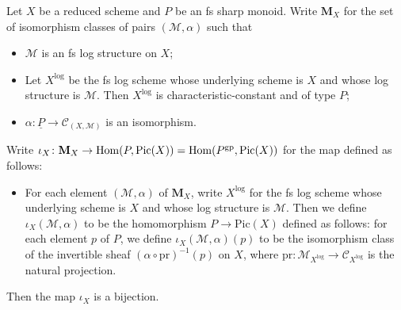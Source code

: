 \begin{lem}\label{CharacteristicConstantLogSchemes}
  Let $X$ be a reduced scheme and $P$ be an fs sharp monoid. Write $\mathbf{M}_X$ for the set of isomorphism classes of pairs $(\mathcal{M}, \alpha)$ such that
  \begin{itemize}
    \item $\mathcal{M}$ is an fs log structure on $X$;
    \item Let $X^\log$ be the fs log scheme whose underlying scheme is $X$ and whose log structure is $\mathcal{M}$. Then $X^\log$ is characteristic-constant and of type $P$;
    \item $\alpha \colon \underline{P} \to \mathcal{C}_{(X, \mathcal{M})}$ is an isomorphism.
  \end{itemize}
  Write $\iota_X \colon \mathbf{M}_X \to \mathrm{Hom}(P, \mathrm{Pic}(X)) = \mathrm{Hom}(P^{\mathrm{gp}}, \mathrm{Pic}(X))$ for the map defined as follows:
  \begin{itemize}
    \item For each element $(\mathcal{M}, \alpha)$ of $\mathbf{M}_X$, write $X^\log$ for the fs log scheme whose underlying scheme is $X$ and whose log structure is $\mathcal{M}$. Then we define $\iota_X(\mathcal{M}, \alpha)$ to be the homomorphism $P \to \mathrm{Pic}(X)$ defined as follows: for each element $p$ of $P$, we define $\iota_X(\mathcal{M}, \alpha)(p)$ to be the isomorphism class of the invertible sheaf $(\alpha \circ \mathrm{pr})^{-1}(p)$ on $X$, where $\mathrm{pr} \colon \mathcal{M}_{X^\log} \to \mathcal{C}_{X^\log}$ is the natural projection.
  \end{itemize}
  Then the map $\iota_X$ is a bijection.
\end{lem}
